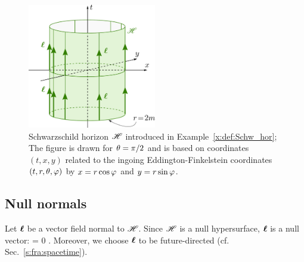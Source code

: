 \begin{figure}
\centerline{\includegraphics[width=0.5\textwidth]{def_Schwarz_horizon.pdf}}
\caption[]{\label{f:def:Schwarz_horizon} \footnotesize
Schwarzschild horizon $\mathscr{H}$ introduced in Example~\ref{x:def:Schw_hor};
The figure is drawn for $\theta=\pi/2$ and is based on coordinates $(t,x,y)$
related to the ingoing Eddington-Finkelstein coordinates $(t,r,\theta,\varphi)$
by $x=r\cos\varphi$ and $y=r\sin\varphi$.}
\end{figure}



\subsection{Null normals} \label{s:def:null_normal}

Let $\bm{\ell}$ be a vector field normal to $\mathscr{H}$. Since $\mathscr{H}$ is a null hypersurface,
$\bm{\ell}$ is a null vector:
\be \label{e:def:wl_null}
    \wl\cdot\wl = 0 .
\ee
Moreover, we choose $\bm{\ell}$ to be future-directed (cf. Sec.~\ref{s:fra:spacetime}).

